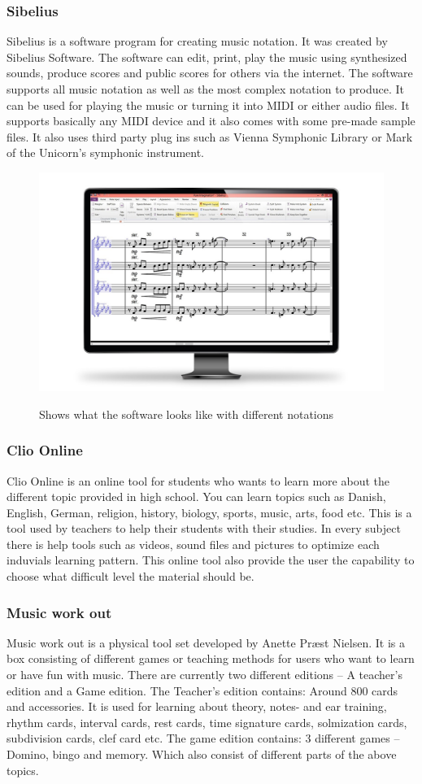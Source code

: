 \subsubsection{Sibelius}
Sibelius is a software program for creating music notation. It was created by Sibelius Software. The software can edit, print, play the music using synthesized sounds, produce scores and public scores for others via the internet. The software supports all music notation as well as the most complex notation to produce. It can be used for playing the music or turning it into MIDI or either audio files. It supports basically any MIDI device and it also comes with some pre-made sample files. It also uses third party plug ins such as Vienna Symphonic Library or Mark of the Unicorn’s symphonic instrument.  

\begin{figure}[H]
	\centering
	\includegraphics[width=0.7\linewidth]{figure/Analysis/Sibelius}
	\label{fig:sibelius}
	\caption{Shows what the software looks like with different notations}
\end{figure}

\subsubsection{Clio Online} 
Clio Online is an online tool for students who wants to learn more about the different topic provided in high school. You can learn topics such as Danish, English, German, religion, history, biology, sports, music, arts, food etc. This is a tool used by teachers to help their students with their studies. In every subject there is help tools such as videos, sound files and pictures to optimize each induvials learning pattern. This online tool also provide the user the capability to choose what difficult level the material should be. 


\subsubsection{Music work out}
Music work out is a physical tool set developed by Anette Præst Nielsen. It is a box consisting of different games or teaching methods for users who want to learn or have fun with music. There are currently two different editions – A teacher’s edition and a Game edition.  The Teacher’s edition contains: Around 800 cards and accessories. It is used for learning about theory, notes- and ear training, rhythm cards, interval cards, rest cards, time signature cards, solmization cards, subdivision cards, clef card etc. The game edition contains: 3 different games – Domino, bingo and memory. Which also consist of different parts of the above topics. 

